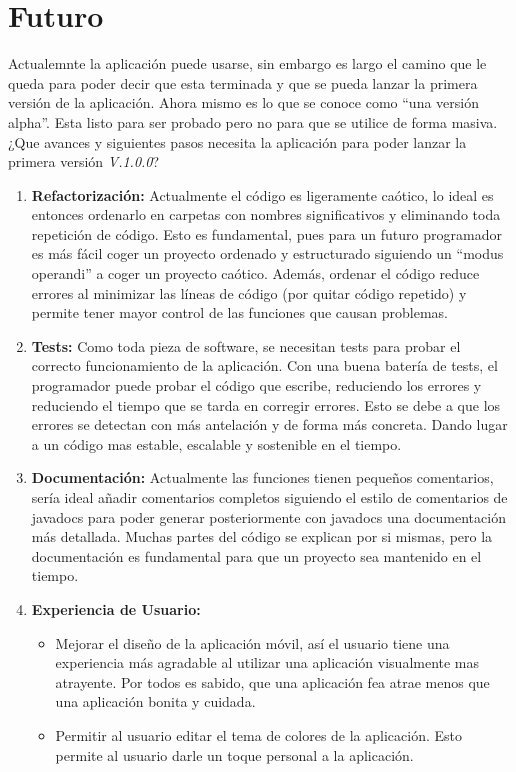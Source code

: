 \chapter{Futuro}
\label{cap:Futuro}

Actualemnte la aplicación puede usarse, sin embargo es largo el camino que le queda para poder decir que esta terminada y que se pueda lanzar la primera versión de la aplicación. Ahora mismo es lo que se conoce como ``una versión alpha''. Esta listo para ser probado pero no para que se utilice de forma masiva. ¿Que avances y siguientes pasos necesita la aplicación para poder lanzar la primera versión \emph{V.1.0.0}?

\begin{enumerate}
\item \textbf{Refactorización: } Actualmente el código es ligeramente caótico, lo ideal es entonces ordenarlo en carpetas con nombres significativos y eliminando toda repetición de código. Esto es fundamental, pues para un futuro programador es más fácil coger un proyecto ordenado y estructurado siguiendo un ``modus operandi'' a coger un proyecto caótico. Además, ordenar el código reduce errores al minimizar las líneas de código (por quitar código repetido) y permite tener mayor control de las funciones que causan problemas. 

\item \textbf{Tests: } Como toda pieza de software, se necesitan tests para probar el correcto funcionamiento de la aplicación. Con una buena batería de tests, el programador puede probar el código que escribe, reduciendo los errores y reduciendo el tiempo que se tarda en corregir errores. Esto se debe a que los errores se detectan con más antelación y de forma más concreta. Dando lugar a un código mas estable, escalable y sostenible en el tiempo. 

\item \textbf{Documentación: } Actualmente las funciones tienen pequeños comentarios, sería ideal añadir comentarios completos siguiendo el estilo de comentarios de javadocs para poder generar posteriormente con javadocs una documentación más detallada. Muchas partes del código se explican por si mismas, pero la documentación es fundamental para que un proyecto sea mantenido en el tiempo.

\item \textbf{Experiencia de Usuario: } 
  \begin{itemize}
  \item Mejorar el diseño de la aplicación móvil, así el usuario tiene una experiencia más agradable al utilizar una aplicación visualmente mas atrayente. Por todos es sabido, que una aplicación fea atrae menos que una aplicación bonita y cuidada. 
  \item Permitir al usuario editar el tema de colores de la aplicación. Esto permite al usuario darle un toque personal a la aplicación.
  \end{itemize}


\end{enumerate}

